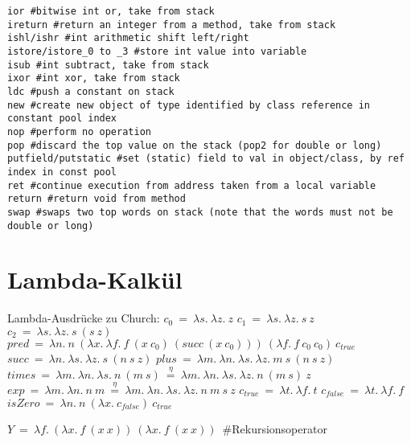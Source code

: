 \documentclass{article}
\begin{document}
\begin{lstlisting}
ior #bitwise int or, take from stack
ireturn #return an integer from a method, take from stack
ishl/ishr #int arithmetic shift left/right
istore/istore_0 to _3 #store int value into variable
isub #int subtract, take from stack
ixor #int xor, take from stack
ldc #push a constant on stack
new #create new object of type identified by class reference in constant pool index
nop #perform no operation
pop #discard the top value on the stack (pop2 for double or long)
putfield/putstatic #set (static) field to val in object/class, by ref index in const pool
ret #continue execution from address taken from a local variable
return #return void from method
swap #swaps two top words on stack (note that the words must not be double or long)
\end{lstlisting}

\newpage


\section{Lambda-Kalkül}
{\large
Lambda-Ausdrücke zu Church:\newline
$c_0~=~\lambda s.~\lambda z.~z$\newline
$c_1~=~\lambda s.~\lambda z.~s~z$\newline
$c_2~=~\lambda s.~\lambda z.~s~(s~z)$\newline
$pred~=~\lambda n.~n~(\lambda x.~\lambda f.~f~(x~c_0)~(succ~(x~c_0)))~(\lambda f.~f~c_0~c_0)~c_{true}$\newline
$succ~=~\lambda n.~\lambda s.~\lambda z.~s~(n~s~z)$\newline
$plus~=~\lambda m.~\lambda n.~\lambda s.~\lambda z.~m~s~(n~s~z)$\newline
$times~=~\lambda m.~\lambda n.~\lambda s.~n~(m~s)~\stackrel{\eta}{=}~\lambda m.~\lambda n.~\lambda s.~\lambda z.~n~(m~s)~z$\newline
$exp~=~\lambda m.~\lambda n.~n~m~\stackrel{\eta}{=}~\lambda m.~\lambda n.~\lambda s.~\lambda z.~n~m~s~z$\newline
$c_{true}~=~\lambda t.~\lambda f.~t$\newline
$c_{false}~=~\lambda t.~\lambda f.~f$\newline
$isZero~=~\lambda n.~n~(\lambda x.~c_{false})~c_{true}$\newline


\noindent$Y~=~\lambda f.~(\lambda x.~f~(x~x))~(\lambda x.~f~(x~x))$~\#Rekursionsoperator\newline
}
\vspace{1em}
\end{document}
